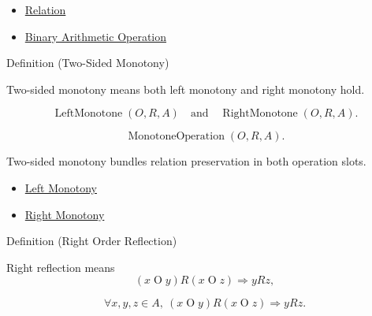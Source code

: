 \begin{dependencies}
\begin{itemize}
  \item \hyperref[def:relation]{Relation}
  \item \hyperref[def:binary-arithmetic-operation]{Binary Arithmetic Operation}
\end{itemize}
\end{dependencies}

\begin{definitionbox}{Definition (Two-Sided Monotony)}
\begin{definition}
\label{def:two-sided-monotony}
Two-sided monotony means both left monotony and right monotony hold.
\end{definition}
\end{definitionbox}

\begin{remark*}
\[
\operatorname{LeftMonotone}(O,R,A)
\quad\text{and}\quad
\operatorname{RightMonotone}(O,R,A).
\]
\end{remark*}

\begin{remark*}
\[
\operatorname{MonotoneOperation}(O,R,A).
\]
\end{remark*}

\begin{remark*}[Interpretation]
Two-sided monotony bundles relation preservation in both operation slots.
\end{remark*}

\begin{dependencies}
\begin{itemize}
  \item \hyperref[def:left-monotony]{Left Monotony}
  \item \hyperref[def:right-monotony]{Right Monotony}
\end{itemize}
\end{dependencies}

\begin{definitionbox}{Definition (Right Order Reflection)}
\begin{definition}
\label{def:right-order-reflection}
Right reflection means
\[
(x\mathbin{O}y)R(x\mathbin{O}z) \Longrightarrow yRz,
\]
\end{definition}
\end{definitionbox}

\begin{remark*}
\[
\forall x,y,z\in A,\ (x\mathbin{O}y)R(x\mathbin{O}z) \Longrightarrow yRz.
\]
\end{remark*}

